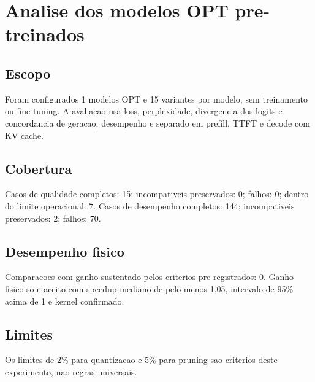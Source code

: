 \chapter{Analise dos modelos OPT pre-treinados}
\section{Escopo}
Foram configurados 1 modelos OPT e 15 variantes por modelo, sem treinamento ou fine-tuning.
A avaliacao usa loss, perplexidade, divergencia dos logits e concordancia de geracao; desempenho e separado em prefill, TTFT e decode com KV cache.
\section{Cobertura}
Casos de qualidade completos: 15; incompativeis preservados: 0; falhos: 0; dentro do limite operacional: 7.
Casos de desempenho completos: 144; incompativeis preservados: 2; falhos: 70.
\section{Desempenho fisico}
Comparacoes com ganho sustentado pelos criterios pre-registrados: 0.
Ganho fisico so e aceito com speedup mediano de pelo menos 1,05, intervalo de 95\% acima de 1 e kernel confirmado.
\section{Limites}
Os limites de 2\% para quantizacao e 5\% para pruning sao criterios deste experimento, nao regras universais.
